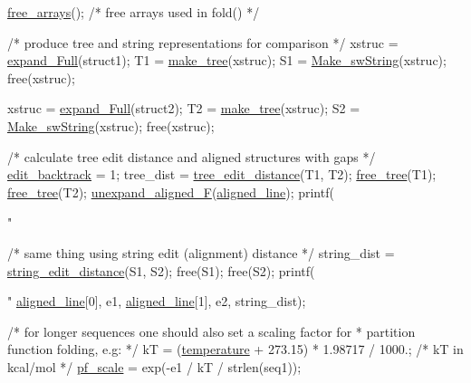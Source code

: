 \begin{DoxyCodeInclude}
  \mbox{\hyperlink{group__mfe__fold__single_ga107fdfe5fd641868156bfd849f6866c7}{free\_arrays}}();      \textcolor{comment}{/* free arrays used in fold() */}

  \textcolor{comment}{/* produce tree and string representations for comparison */}
  xstruc  = \mbox{\hyperlink{group__struct__utils_ga78d73cd54a068ef2812812771cdddc6f}{expand\_Full}}(struct1);
  T1      = \mbox{\hyperlink{treedist_8h_a08fe4d5afd385dce593b86eaf010c6e3}{make\_tree}}(xstruc);
  S1      = \mbox{\hyperlink{stringdist_8h_a3125991b3a403b3f89230474deb3f22e}{Make\_swString}}(xstruc);
  free(xstruc);

  xstruc  = \mbox{\hyperlink{group__struct__utils_ga78d73cd54a068ef2812812771cdddc6f}{expand\_Full}}(struct2);
  T2      = \mbox{\hyperlink{treedist_8h_a08fe4d5afd385dce593b86eaf010c6e3}{make\_tree}}(xstruc);
  S2      = \mbox{\hyperlink{stringdist_8h_a3125991b3a403b3f89230474deb3f22e}{Make\_swString}}(xstruc);
  free(xstruc);

  \textcolor{comment}{/* calculate tree edit distance and aligned structures with gaps */}
  \mbox{\hyperlink{dist__vars_8h_aa03194c513af6b860e7b33e370b82bdb}{edit\_backtrack}}  = 1;
  tree\_dist       = \mbox{\hyperlink{treedist_8h_a3b21f1925f7071f46d93431a835217bb}{tree\_edit\_distance}}(T1, T2);
  \mbox{\hyperlink{treedist_8h_acbc1cb9bce582ea945e4a467c76a57aa}{free\_tree}}(T1);
  \mbox{\hyperlink{treedist_8h_acbc1cb9bce582ea945e4a467c76a57aa}{free\_tree}}(T2);
  \mbox{\hyperlink{group__struct__utils_ga1054c4477d53b31d79d4cb132100e87a}{unexpand\_aligned\_F}}(\mbox{\hyperlink{dist__vars_8h_ac1605fe3448ad0a0b809c4fb8f6a854a}{aligned\_line}});
  printf(\textcolor{stringliteral}{"%

  \textcolor{comment}{/* same thing using string edit (alignment) distance */}
  string\_dist = \mbox{\hyperlink{stringdist_8h_a89e3c335ef17780576d7c0e713830db9}{string\_edit\_distance}}(S1, S2);
  free(S1);
  free(S2);
  printf(\textcolor{stringliteral}{"%
         \mbox{\hyperlink{dist__vars_8h_ac1605fe3448ad0a0b809c4fb8f6a854a}{aligned\_line}}[0], e1, \mbox{\hyperlink{dist__vars_8h_ac1605fe3448ad0a0b809c4fb8f6a854a}{aligned\_line}}[1], e2, string\_dist);

  \textcolor{comment}{/* for longer sequences one should also set a scaling factor for}
\textcolor{comment}{   * partition function folding, e.g: */}
  kT        = (\mbox{\hyperlink{group__model__details_gab4b11c8d9c758430960896bc3fe82ead}{temperature}} + 273.15) * 1.98717 / 1000.; \textcolor{comment}{/* kT in kcal/mol */}
  \mbox{\hyperlink{group__model__details_gad3b22044065acc6dee0af68931b52cfd}{pf\_scale}}  = exp(-e1 / kT / strlen(seq1));

}}
\end{DoxyCodeInclude}
